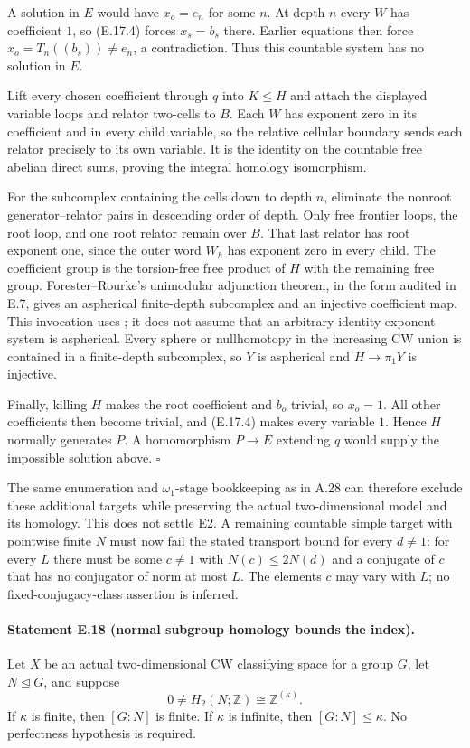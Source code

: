 A solution in $E$ would have $x_o=e_n$ for some $n$.
At depth $n$ every $W$ has coefficient $1$, so (E.17.4)
forces $x_s=b_s$ there. Earlier equations then force
$x_o=T_n((b_s))\ne e_n$, a contradiction. Thus this countable
system has no solution in $E$.

Lift every chosen coefficient through $q$ into $K\leq H$
and attach the displayed variable loops and relator two-cells
to $B$. Each $W$ has exponent zero in its coefficient and
in every child variable, so the relative cellular boundary
sends each relator precisely to its own variable. It is the
identity on the countable free abelian direct sums, proving
the integral homology isomorphism.

For the subcomplex containing the cells down to depth $n$,
eliminate the nonroot generator--relator pairs in descending
order of depth. Only free frontier loops, the root loop,
and one root relator remain over $B$. That last relator has
root exponent one, since the outer word $W_h$ has exponent
zero in every child. The coefficient group is the torsion-free
free product of $H$ with the remaining free group.
Forester--Rourke's unimodular adjunction theorem, in the
form audited in E.7, gives an aspherical finite-depth
subcomplex and an injective coefficient map. This invocation
uses \cite[Main Theorem]{EForesterRourkeDiagrams}; it does not
assume that an arbitrary identity-exponent system is aspherical.
Every sphere or nullhomotopy in the increasing CW union is
contained in a finite-depth subcomplex, so $Y$ is aspherical
and $H\to\pi_1Y$ is injective.

Finally, killing $H$ makes the root coefficient and $b_o$
trivial, so $x_o=1$. All other coefficients then become
trivial, and (E.17.4) makes every variable $1$. Hence $H$
normally generates $P$. A homomorphism $P\to E$ extending
$q$ would supply the impossible solution above.
\hfill$\square$

The same enumeration and $\omega_1$-stage bookkeeping as in
A.28 can therefore exclude these additional targets while
preserving the actual two-dimensional model and its homology.
This does not settle E2. A remaining countable simple target
with pointwise finite $N$ must now fail the stated transport
bound for every $d\ne1$: for every $L$ there must be some
$c\ne1$ with $N(c)\leq2N(d)$ and a conjugate of $c$ that
has no conjugator of norm at most $L$. The elements $c$ may
vary with $L$; no fixed-conjugacy-class assertion is inferred.

\paragraph{Statement E.18 (normal subgroup homology bounds the index).}
Let $X$ be an actual two-dimensional CW classifying space for a
group $G$, let $N\trianglelefteq G$, and suppose
\[
       0\ne H_2(N;\mathbb Z)\cong\mathbb Z^{(\kappa)}.
\]
If $\kappa$ is finite, then $[G:N]$ is finite.
If $\kappa$ is infinite, then $[G:N]\leq\kappa$.
No perfectness hypothesis is required.

